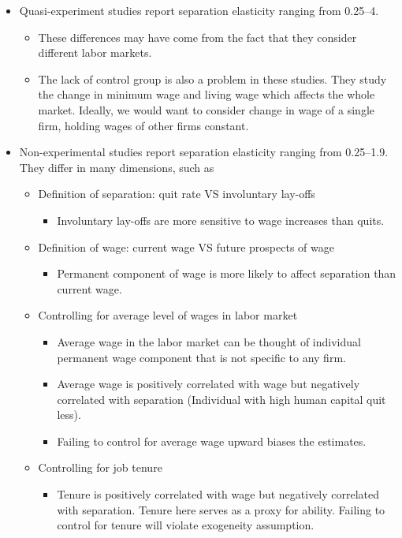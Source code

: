 \documentclass[a4paper, 12pt]{article}
\begin{document}
\begin{itemize}
\item Quasi-experiment studies report separation elasticity ranging from 0.25--4.
\begin{itemize}
\item These differences may have come from the fact that they consider different labor markets.
\item The lack of control group is also a problem in these studies. They study the change in minimum wage and living wage which affects the whole market. Ideally, we would want to consider change in wage of a single firm, holding wages of other firms constant.
\end{itemize}
\item Non-experimental studies report separation elasticity ranging from 0.25--1.9. They differ in many dimensions, such as
\begin{itemize}
\item Definition of separation: quit rate VS involuntary lay-offs 
\begin{itemize}
\item Involuntary lay-offs are more sensitive to wage increases than quits.
\end{itemize}
\item Definition of wage: current wage VS future prospects of wage
\begin{itemize}
\item Permanent component of wage is more likely to affect separation than current wage.
\end{itemize}
\item Controlling for average level of wages in labor market
\begin{itemize}
\item Average wage in the labor market can be thought of individual permanent wage component that is not specific to any firm.
\item Average wage is positively correlated with wage but negatively correlated with separation (Individual with high human capital quit less).
\item Failing to control for average wage upward biases the estimates.
\end{itemize}
\item Controlling for job tenure
\begin{itemize}
\item Tenure is positively correlated with wage but negatively correlated with separation. Tenure here serves as a proxy for ability. Failing to control for tenure will violate exogeneity assumption. 

\end{itemize}
\end{itemize}
\end{itemize}
\end{document}
